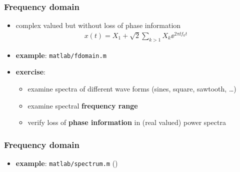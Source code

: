 \begin{frame} %
	\frametitle{Frequency domain}
	\begin{itemize}
		\item complex valued but without loss of phase information
			\begin{align*}
				x(t)=X_1+\sqrt2\sum_{k>1}X_k\ee^{2\pi\ii f_kt}
			\end{align*}
		\item \textbf{example}: \texttt{matlab/fdomain.m}
			\begin{figure}
				\centering
				\begin{subfigure}[c]{0.48\linewidth}
				\end{subfigure}
				\hspace{0.01\linewidth}
				\begin{subfigure}[c]{0.48\linewidth}
				\end{subfigure}
			\end{figure}
		\item \textbf{exercise}:
			\begin{itemize}
				\item examine spectra of different wave forms (sines, square, sawtooth, \ldots)
				\item examine spectral \textbf{frequency range}
				\item verify loss of \textbf{phase information} in (real valued) power spectra
			\end{itemize}
	\end{itemize}
\end{frame}

\begin{frame} %
	\frametitle{Frequency domain}
	\begin{itemize}
		\item \textbf{example}: \texttt{matlab/spectrum.m} ()
			\begin{figure}
				\centering
				\begin{subfigure}[c]{0.48\linewidth}
				\end{subfigure}
				\hspace{0.01\linewidth}
				\begin{subfigure}[c]{0.48\linewidth}
				\end{subfigure}
			\end{figure}
	\end{itemize}
\end{frame}
